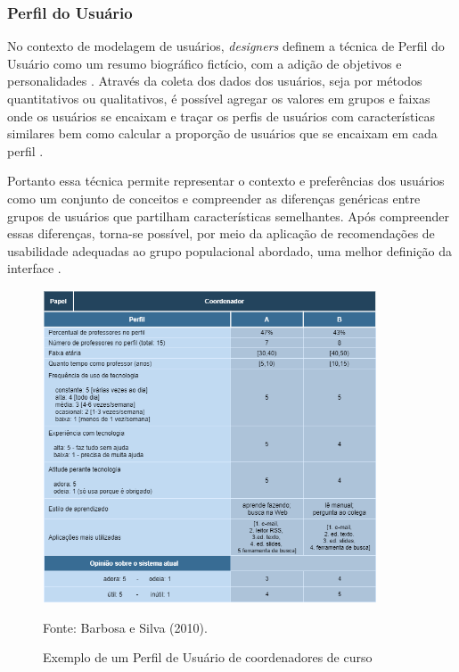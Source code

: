 \documentclass[12pt]{article}
\begin{document}
\subsubsection{Perfil do Usuário}
\par No contexto de modelagem de usuários, \emph{designers} definem a técnica de Perfil do Usuário como um resumo biográfico fictício, com a adição de objetivos e personalidades \cite{10.1007/BF00143964}. Através da coleta dos dados dos usuários, seja por métodos quantitativos ou qualitativos, é possível agregar os valores em grupos e faixas onde os usuários se encaixam e traçar os perfis de usuários com características similares bem como calcular a proporção de usuários que se encaixam em cada perfil \cite{barbosa2010interacao}.

Portanto essa técnica permite representar o contexto e preferências dos usuários como um conjunto de conceitos e compreender as diferenças genéricas entre grupos de usuários que partilham características semelhantes. Após compreender essas diferenças, torna-se possível, por meio da aplicação de recomendações de usabilidade adequadas ao grupo populacional abordado, uma melhor definição da interface \cite{10.1145/1111360.1111388} \cite{7358378}.

\begin{figure}[H]
    \centering
    \includegraphics[width=0.882\textwidth]{images/PerfilDoUsuario.png}
    \caption{Exemplo de um Perfil de Usuário de coordenadores de curso}
    \label{fig:PerfilDoUsuario}
    {Fonte: Barbosa e Silva (2010).}
\end{figure}
\end{document}
